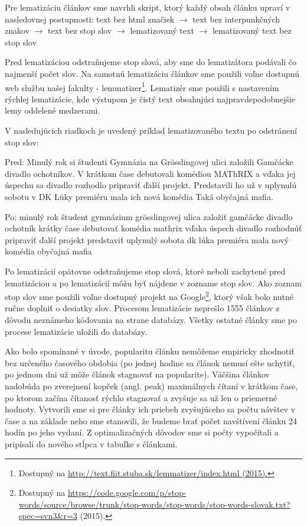 \documentclass[runningheads,a4paper]{llncs}
\begin{document}
Pre lematizáciu článkov sme navrhli skript, ktorý každý obsah článku upraví v nasledovnej postupnosti:
\newline
\newline
text bez html značiek $\rightarrow$ text bez interpunkčných znakov $\rightarrow$ text bez stop slov $\rightarrow$ lematizovaný text $\rightarrow$ lematizovaný text bez stop slov
\newline

Pred lematizáciou odstraňujeme stop slová, aby sme do lematizátora podávali čo najmenší počet slov.
Na samotnú lematizáciu článkov sme použili voľne dostupnú web službu našej fakulty - lemmatizer\footnote{Dostupný na \url{http://text.fiit.stuba.sk/lemmatizer/index.html (2015).}}.
Lematizér sme použili s nastavením rýchlej lematizácie, kde výstupom je čistý text obsahujúci najpravdepodobnejšie lemy oddelené medzerami.

V nasledujúcich riadkoch je uvedený príklad lematizovaného textu po odstránení stop slov:

\begin{multicols}{2}
Pred: Minulý rok si študenti Gymnázia na Grösslingovej ulici založili Gamčácke divadlo ochotníkov. V krátkom čase debutovali komédiou MAThRIX a vďaka jej úspechu sa divadlo rozhodlo pripraviť ďalší projekt. Predstavili ho už v uplynulú sobotu v DK Lúky premiéru mala ich nová komédia Taká obyčajná mafia.

Po: minulý rok študent gymnázium grösslingovej ulica založiť gamčácke divadlo ochotník krátky čase debutovať komédia mathrix vďaka úspech divadlo rozhodnúť pripraviť ďalší projekt predstaviť uplynulý sobota dk lúka premiéra mala nový komédia obyčajná mafia
\end{multicols}

Po lematizácií opätovne odstraňujeme stop slová, ktoré neboli zachytené pred lematizáciou a po lematizácií môžu byť nájdene v zozname stop slov.
Ako zoznam stop slov sme použili voľne dostupný projekt na Google\footnote{Dostupný na \url{https://code.google.com/p/stop-words/source/browse/trunk/stop-words/stop-words/stop-words-slovak.txt?spec=svn3&r=3} (2015).}, ktorý však bolo nutné ručne doplniť o desiatky slov.
Procesom lematizácie neprešlo 1555 článkov z dôvodu neznámeho kódovania na strane databázy. Všetky ostatné články sme po procese lematizácie uložili do databázy.  

Ako bolo spomínané v úvode, popularitu článku nemôžeme empiricky zhodnotiť bez určeného časového obdobia (po jednej hodine sa článok nemusí ešte uchytiť, po jednom dni už môže článok stagnovať na popularite).
Väčšina článkov nadobúda po zverejnení kopček (angl. peak) maximálnych čítaní v krátkom čase, po ktorom začína čítanosť rýchlo stagnovať a zvyšuje sa už len o priemerné hodnoty.
Vytvorili sme si pre články ich priebeh zvyšujúceho sa počtu návštev v čase a na základe neho sme stanovili, že budeme brať počet navštívení článku 24 hodín po jeho vydaní.
Z optimalizačných dôvodov sme si počty vypočítali a pripísali do nového stĺpca v tabuľke s článkami.
\end{document}
